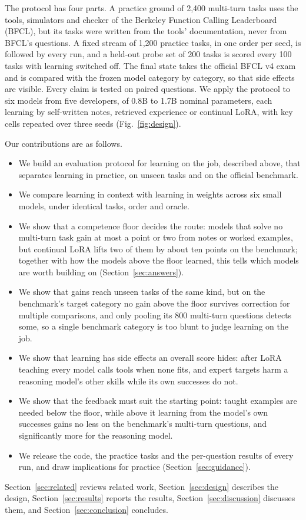 \documentclass[a4paper,fleqn]{cas-dc}
\begin{document}
The protocol has four parts. A practice ground of 2,400 multi-turn tasks uses the tools, simulators and
checker of the Berkeley Function Calling Leaderboard (BFCL), but its tasks were written from the tools' documentation,
never from BFCL's questions. A fixed stream of 1,200 practice tasks, in one order per seed, is followed by every run, and a held-out probe set of
200 tasks is scored every 100 tasks with learning switched off. The final state takes the official BFCL v4 exam and is
compared with the frozen model category by category, so that side effects are visible. Every claim is tested on paired questions. We apply the protocol to six models from five
developers, of 0.8B to 1.7B nominal parameters, each learning by self-written notes, retrieved experience or continual
LoRA, with key cells repeated over three seeds (Fig.~\ref{fig:design}).

Our contributions are as follows.
\begin{itemize}[leftmargin=1.5em,itemsep=1pt,topsep=3pt]
\item We build an evaluation protocol for learning on the job, described above, that separates learning in practice,
  on unseen tasks and on the official benchmark.
\item We compare learning in context with learning in weights across six small models, under identical tasks,
  order and oracle.
\item We show that a competence floor decides the route: models that solve no multi-turn task gain at most a point or
  two from notes or worked examples, but continual LoRA lifts two of them by about ten points on the benchmark; together with how the models above
  the floor learned, this tells which models are worth building on (Section~\ref{sec:answers}).
\item We show that gains reach unseen tasks of the same kind, but on the benchmark's target category no gain above the
  floor survives correction for multiple comparisons, and only pooling its 800 multi-turn questions detects some, so a
  single benchmark category is too blunt to judge learning on the job.
\item We show that learning has side effects an overall score hides: after LoRA teaching every model calls tools when none fits,
  and expert targets harm a reasoning model's other skills while its own successes do not.
\item We show that the feedback must suit the starting point: taught examples are needed below the floor, while above
  it learning from the model's own successes gains no less on the benchmark's multi-turn questions, and significantly more for the reasoning
  model.
\item We release the code, the practice tasks and the per-question results of every run, and draw implications for
  practice (Section~\ref{sec:guidance}).
\end{itemize}
Section~\ref{sec:related} reviews related work, Section~\ref{sec:design} describes the design,
Section~\ref{sec:results} reports the results, Section~\ref{sec:discussion} discusses them, and
Section~\ref{sec:conclusion} concludes.
\end{document}
